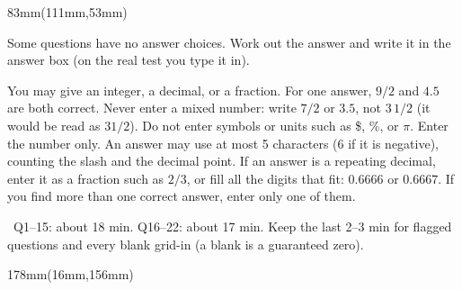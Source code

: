 \documentclass[a4paper]{article}
\newcommand{\RCOL}{111mm}
\newcommand{\COLW}{83mm}
\begin{document}
\begin{textblock*}{\COLW}(\RCOL,53mm)
{\fontsize{9.4}{12.2}\selectfont
{}
Some questions have no answer choices. Work out the answer and write it in the answer box (on the real test you type it in).
\begin{itemize}[leftmargin=5mm,itemsep=1.2mm,topsep=1.6mm,parsep=0mm]
\bul You may give an integer, a decimal, or a fraction. For one answer, $9/2$ and $4.5$ are both correct.
\bul Never enter a mixed number: write $7/2$ or $3.5$, not $3\,1/2$ (it would be read as $31/2$).
\bul Do not enter symbols or units such as \$, \%, or $\pi$. Enter the number only.
\bul An answer may use at most 5 characters (6 if it is negative), counting the slash and the decimal point.
\bul If an answer is a repeating decimal, enter it as a fraction such as $2/3$, or fill all the digits that fit: $0.6666$ or $0.6667$.
\bul If you find more than one correct answer, enter only one of them.
\end{itemize}
\vspace{1.2mm}
\noindent{}
\par\vspace{3mm}
\ Q1--15: about 18 min. Q16--22: about 17 min. Keep the last 2--3 min for flagged questions and every blank grid-in (a blank is a guaranteed zero).
}
\end{textblock*}

\begin{textblock*}{178mm}(16mm,156mm)
\end{textblock*}

\newcommand{\refcell}[3]{\begin{textblock*}{42mm}(#1mm,#2mm)\begin{minipage}[t][36mm][t]{42mm}\centering #3\end{minipage}\end{textblock*}}
\newcommand{\refin}[2]{\parbox[b][26mm][b]{42mm}{\centering #1}\par\vspace{1.6mm}{\fontsize{9.6}{11.5}\selectfont #2}}
\end{document}
